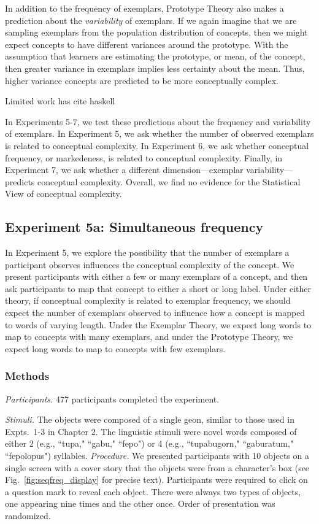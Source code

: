 In addition to the frequency of exemplars, Prototype Theory also makes a prediction about the {\it variability} of exemplars. If we again imagine that we are sampling exemplars from the population distribution of concepts, then we might expect concepts to have different variances around the prototype. With the assumption that learners are estimating the prototype, or mean, of the concept, then greater variance in exemplars implies less certainty about the mean. Thus, higher variance concepts are predicted to be more conceptually complex.

Limited work has 
cite haskell

In Experiments 5-7, we test these predictions about the frequency and variability of exemplars. In Experiment 5, we ask whether the number of observed exemplars is related to conceptual complexity. In Experiment 6, we ask whether conceptual frequency, or markedeness, is related to conceptual complexity.  Finally, in Experiment 7, we ask whether a different dimension---exemplar variability---predicts conceptual complexity. Overall, we find no evidence for the Statistical View of conceptual complexity. 

\subsection{Experiment 5a: Simultaneous frequency}
In Experiment 5, we explore the possibility that the number of exemplars a participant observes influences the conceptual complexity of the concept. We present participants with either a few or many exemplars of a concept, and then ask participants to map that concept to either a short or long label. Under either theory, if conceptual complexity is related to exemplar frequency, we should expect the number of exemplars observed to influence how a concept is mapped to words of varying length. Under the Exemplar Theory, we expect long words to map to concepts with many exemplars, and under the Prototype Theory, we expect long words to map to concepts with few exemplars.

\subsubsection{Methods}
{\it Participants.} 
477 participants completed the experiment.

{\it Stimuli.} 
The objects were composed of a single geon, similar to those used in Expts.\ 1-3 in Chapter 2. The linguistic stimuli were novel words composed of either 2 (e.g., ``tupa," ``gabu," ``fepo")  or 4  (e.g., ``tupabugorn," ``gaburatum," ``fepolopus")  syllables.
{\it Procedure.} 
We presented participants with 10 objects on a single screen with a cover story that the objects were from a character's box (see Fig.\ \ref{fig:seqfreq_display} for precise text). Participants were required to click on a question mark to reveal each object. There were always two types of objects, one appearing nine times and the other once. Order of presentation was randomized.

